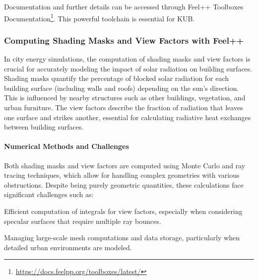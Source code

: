 \documentclass[runningheads]{llncs}
\begin{document}

Documentation and further details can be accessed through Feel++ Toolboxes Documentation\footnote{\url{https://docs.feelpp.org/toolboxes/latest/}}.
This powerful toolchain is essential for KUB.

\subsubsection{Computing Shading Masks and View Factors with Feel++}

In city energy simulations, the computation of shading masks and view factors is crucial for accurately modeling the impact of solar radiation on building surfaces. Shading masks quantify the percentage of blocked solar radiation for each building surface (including walls and roofs) depending on the sun's direction. This is influenced by nearby structures such as other buildings, vegetation, and urban furniture. The view factors describe the fraction of radiation that leaves one surface and strikes another, essential for calculating radiative heat exchanges between building surfaces.

\paragraph{Numerical Methods and Challenges}
Both shading masks and view factors are computed using Monte Carlo and ray tracing techniques, which allow for handling complex geometries with various obstructions. Despite being purely geometric quantities, these calculations face significant challenges such as:
\begin{inparaenum}[\it (i)]
    \item Efficient computation of integrals for view factors, especially when considering specular surfaces that require multiple ray bounces.
    \item Managing large-scale mesh computations and data storage, particularly when detailed urban environments are modeled.
\end{inparaenum}
\end{document}

